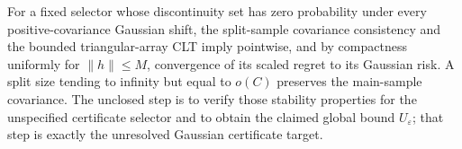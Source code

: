 For a fixed selector whose discontinuity set has zero probability under every positive-covariance Gaussian shift, the split-sample covariance consistency and the bounded triangular-array CLT imply pointwise, and by compactness uniformly for \(\|h\|\leq M\), convergence of its scaled regret to its Gaussian risk.  A split size tending to infinity but equal to \(o(C)\) preserves the main-sample covariance.  The unclosed step is to verify those stability properties for the unspecified certificate selector and to obtain the claimed global bound \(U_\varepsilon\); that step is exactly the unresolved Gaussian certificate target.